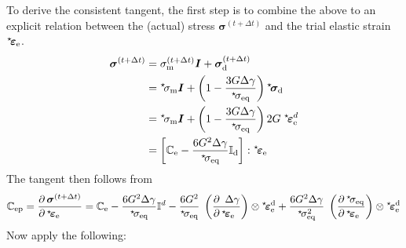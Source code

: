\documentclass[times,namecite]{goose-article}
\newcommand\leftstar[1]{\hspace*{-.3em}~^\star\!#1}
\begin{document}
To derive the consistent tangent, the first step is to combine the above to an explicit relation between the (actual) stress $\bm{\sigma}^{(t+\Delta t)}$ and the trial elastic strain $\leftstar{\bm{\varepsilon}}_\mathrm{e}$.
%
\begin{align}
  \bm{\sigma}^{(t+\Delta t)}
  &= \sigma_\mathrm{m}^{(t+\Delta t)} \bm{I} + \bm{\sigma}_\mathrm{d}^{(t+\Delta t)}
  \\
  &= \leftstar{\sigma}_\mathrm{m} \bm{I} +
  \left( 1 - \frac{3 G \Delta \gamma}{\leftstar{\sigma}_\mathrm{eq}} \right) \leftstar{\bm{\sigma}}_\mathrm{d}
  \\
  &= \leftstar{\sigma}_\mathrm{m} \bm{I} +
  \left( 1 - \frac{3 G \Delta \gamma}{\leftstar{\sigma}_\mathrm{eq}} \right) 2 G \; \leftstar{\bm{\varepsilon}}_\mathrm{e}^d
  \\
  \label{eq:tangent:stress-strain}
  &= \left[ \mathbb{C}_\mathrm{e} - \frac{6 G^2 \Delta \gamma}{\leftstar{\sigma}_\mathrm{eq}} \mathbb{I}_\mathrm{d} \right] : \leftstar{\bm{\varepsilon}}_\mathrm{e}
\end{align}
%
The tangent then follows from
%
\begin{equation}
\mathbb{C}_\mathrm{ep}
=
\frac{
  \partial \, \bm{\sigma}^{(t+\Delta t)} \hfill
}{
  \partial \, \leftstar{\bm{\varepsilon}}_\mathrm{e} \hfill
}
=
\mathbb{C}_\mathrm{e}
- \frac{6 G^2 \Delta \gamma}{\leftstar{\sigma}_\mathrm{eq}} \mathbb{I}^d
- \frac{6 G^2}{\leftstar{\sigma}_\mathrm{eq}} \;
\left( \frac{
  \partial \,~\Delta \gamma \hfill
}{
  \partial \,\leftstar{\bm{\varepsilon}}_\mathrm{e} \hfill
} \right) \otimes
\leftstar{\bm{\varepsilon}}_\mathrm{e}^\mathrm{d}
+ \frac{6 G^2 \Delta \gamma}{\leftstar{\sigma}_\mathrm{eq}^2} \;
\left( \frac{
  \partial \,\leftstar{\sigma}_\mathrm{eq} \hfill
}{
  \partial \,\leftstar{\bm{\varepsilon}}_\mathrm{e} \hfill
} \right) \otimes
\leftstar{\bm{\varepsilon}}_\mathrm{e}^\mathrm{d}
\end{equation}
%
Now apply the following:
%
\end{document}
